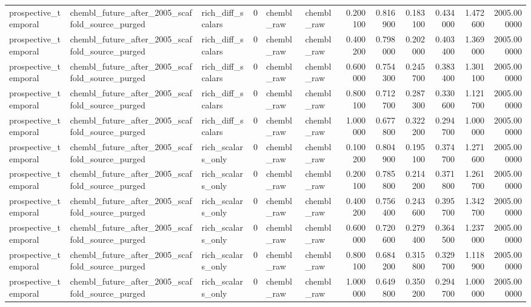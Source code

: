 \begin{longtable}{lllrllrrrrrr}
prospective\_temporal & chembl\_future\_after\_2005\_scaffold\_source\_purged & rich\_diff\_scalars & 0 & chembl\_raw & chembl\_raw & 0.200100 & 0.816900 & 0.183100 & 0.434000 & 1.472600 & 2005.000000 \\
prospective\_temporal & chembl\_future\_after\_2005\_scaffold\_source\_purged & rich\_diff\_scalars & 0 & chembl\_raw & chembl\_raw & 0.400200 & 0.798000 & 0.202000 & 0.403400 & 1.369000 & 2005.000000 \\
prospective\_temporal & chembl\_future\_after\_2005\_scaffold\_source\_purged & rich\_diff\_scalars & 0 & chembl\_raw & chembl\_raw & 0.600000 & 0.754300 & 0.245700 & 0.383400 & 1.301100 & 2005.000000 \\
prospective\_temporal & chembl\_future\_after\_2005\_scaffold\_source\_purged & rich\_diff\_scalars & 0 & chembl\_raw & chembl\_raw & 0.800100 & 0.712700 & 0.287300 & 0.330600 & 1.121700 & 2005.000000 \\
prospective\_temporal & chembl\_future\_after\_2005\_scaffold\_source\_purged & rich\_diff\_scalars & 0 & chembl\_raw & chembl\_raw & 1.000000 & 0.677800 & 0.322200 & 0.294700 & 1.000000 & 2005.000000 \\
prospective\_temporal & chembl\_future\_after\_2005\_scaffold\_source\_purged & rich\_scalars\_only & 0 & chembl\_raw & chembl\_raw & 0.100200 & 0.804900 & 0.195100 & 0.374700 & 1.271600 & 2005.000000 \\
prospective\_temporal & chembl\_future\_after\_2005\_scaffold\_source\_purged & rich\_scalars\_only & 0 & chembl\_raw & chembl\_raw & 0.200100 & 0.785800 & 0.214200 & 0.371800 & 1.261700 & 2005.000000 \\
prospective\_temporal & chembl\_future\_after\_2005\_scaffold\_source\_purged & rich\_scalars\_only & 0 & chembl\_raw & chembl\_raw & 0.400200 & 0.756400 & 0.243600 & 0.395700 & 1.342700 & 2005.000000 \\
prospective\_temporal & chembl\_future\_after\_2005\_scaffold\_source\_purged & rich\_scalars\_only & 0 & chembl\_raw & chembl\_raw & 0.600000 & 0.720600 & 0.279400 & 0.364500 & 1.237000 & 2005.000000 \\
prospective\_temporal & chembl\_future\_after\_2005\_scaffold\_source\_purged & rich\_scalars\_only & 0 & chembl\_raw & chembl\_raw & 0.800100 & 0.684200 & 0.315800 & 0.329700 & 1.118900 & 2005.000000 \\
prospective\_temporal & chembl\_future\_after\_2005\_scaffold\_source\_purged & rich\_scalars\_only & 0 & chembl\_raw & chembl\_raw & 1.000000 & 0.649800 & 0.350200 & 0.294700 & 1.000000 & 2005.000000 \\

\end{longtable}
